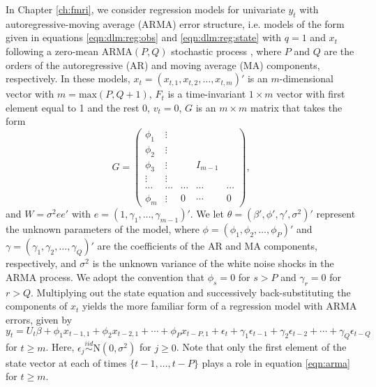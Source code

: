 In Chapter \ref{ch:fmri}, we consider regression models for univariate $y_t$ with autoregressive-moving average (ARMA) error structure, i.e. models of the form given in equations \eqref{eqn:dlm:reg:obs} and \eqref{eqn:dlm:reg:state} with $q = 1$ and $x_t$ following a zero-mean $\mbox{ARMA}(P, Q)$ stochastic process \citep{shum:stof:2006:timeseries}, where $P$ and $Q$ are the orders of the autoregressive (AR) and moving average (MA) components, respectively. In these models, $x_t = (x_{t,1} ,x_{t,2}, \ldots, x_{t,m})'$ is an $m$-dimensional vector with $m = \mbox{max}(P,Q+1)$, $F_t$ is a time-invariant $1 \times m$ vector with first element equal to 1 and the rest 0, $v_t = 0$, $G$ is an $m \times m$ matrix that takes the form
\[
G = \left(
 \begin{array}{ccccc}
 \phi_1 & \vdots \\
 \phi_2 & \vdots \\
 \phi_3 & \vdots && I_{m-1} \\
 \vdots & \vdots \\
 \cdots & \cdots & \cdots & \cdots & \cdots \\
 \phi_m &\vdots & 0 & \cdots & 0
 \end{array}
\right),
\]
and $W = \sigma^2ee'$ with $e = (1, \gamma_1, \ldots, \gamma_{m-1})'$. We let $\theta = (\beta', \phi', \gamma', \sigma^2)'$ represent the unknown parameters of the model, where $\phi = (\phi_1,\phi_2,\ldots,\phi_P)'$ and $\gamma = (\gamma_1,\gamma_2,\ldots,\gamma_Q)'$ are the coefficients of the AR and MA components, respectively, and $\sigma^2$ is the unknown variance of the white noise shocks in the ARMA process. We adopt the convention that $\phi_s = 0$ for $s > P$ and $\gamma_r = 0$ for $r > Q$. Multiplying out the state equation and successively back-substituting the components of $x_t$ \cite[Section 3.2.5,][]{petris:camp:2009:dynamic} yields the more familiar form of a regression model with ARMA errors, given by
\begin{equation}
y_t = U_t\beta + \phi_1x_{t-1,1} + \phi_2x_{t-2,1} + \cdots + \phi_Px_{t-P,1} + \epsilon_t + \gamma_1\epsilon_{t-1} + \gamma_2\epsilon_{t-2} + \cdots + \gamma_Q\epsilon_{t-Q} \label{eqn:arma}
\end{equation}
for $t \ge m$. Here, $\epsilon_j \stackrel{iid}{\sim} \mbox{N}(0,\sigma^2)$ for $j \ge 0$. Note that only the first element of the state vector at each of times $\{t-1,\ldots,t-P\}$ plays a role in equation \eqref{eqn:arma} for $t \ge m$.

